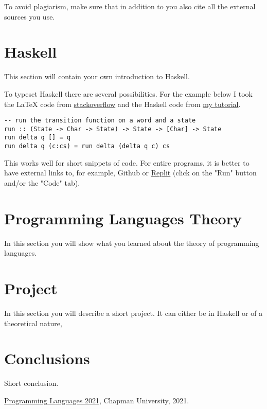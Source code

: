\documentclass{article}
\begin{document}
To avoid plagiarism, make sure that in addition to \cite{PL} you also cite all the external sources you use.

\section{Haskell}\label{haskell}

This section will contain your own introduction to Haskell.

\medskip\noindent
To typeset Haskell there are several possibilities. For the example below I took the LaTeX code from \href{https://stackoverflow.com/a/3175141/4600290}{stackoverflow} and the Haskell code from \href{https://hackmd.io/@alexhkurz/HylLKujCP}{my tutorial}.

\begin{lstlisting}
-- run the transition function on a word and a state
run :: (State -> Char -> State) -> State -> [Char] -> State
run delta q [] = q
run delta q (c:cs) = run delta (delta q c) cs
\end{lstlisting}

\medskip\noindent
This works well for short snippets of code. For entire programs, it is better to have external links to, for example, Github or \href{https://replit.com/@alexhkurz/automata01#main.hs}{Replit} (click on the "Run" button and/or the "Code" tab).


\section{Programming Languages Theory}

In this section you will show what you learned about the theory of programming languages.

\section{Project}

In this section you will describe a short project. It can either be in Haskell or of a theoretical nature,

\section{Conclusions}\label{conclusions}
Short conclusion.

\begin{thebibliography}{99}
 \href{https://github.com/alexhkurz/programming-languages-2021/blob/main/README.md}{Programming Languages 2021}, Chapman University, 2021.
\end{thebibliography}
\end{document}
